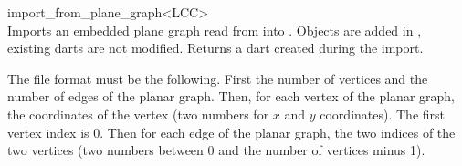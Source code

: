 \begin{ccRefFunction}{import_from_plane_graph<LCC>}
\\

{Imports an embedded plane graph read from  into . 
  Objects are added in , existing darts are not modified.
  Returns a dart created during the import.
}

 The file format must be the following.  First
the number of vertices and the number of edges of the planar graph.
Then, for each vertex of the planar graph, the coordinates of the
\myith{} vertex (two numbers for $x$ and $y$ coordinates). The first
vertex index is $0$. Then for each edge of the planar graph, the two
indices of the two vertices (two numbers between 0 and the number of
vertices minus 1).



\end{ccRefFunction}
